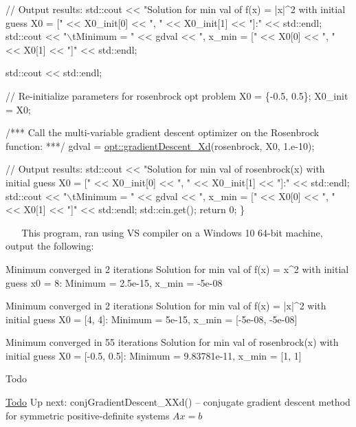 \begin{DoxyCodeInclude}
    \textcolor{comment}{// Output results:}
    std::cout << \textcolor{stringliteral}{"Solution for min val of f(x) = |x|^2 with initial guess X0 = ["} << X0\_init[0] << \textcolor{stringliteral}{", "} << 
      X0\_init[1] << \textcolor{stringliteral}{"]:"} << std::endl;
    std::cout << \textcolor{stringliteral}{"\(\backslash\)tMinimum = "} << gdval << \textcolor{stringliteral}{", x\_min = ["} << X0[0] << \textcolor{stringliteral}{", "} << X0[1] << \textcolor{stringliteral}{"]"} << std::endl;

    std::cout << std::endl;

    \textcolor{comment}{// Re-initialize parameters for rosenbrock opt problem}
    X0 = \{-0.5, 0.5\};
    X0\_init = X0;

    \textcolor{comment}{/*** Call the multi-variable gradient descent optimizer on the Rosenbrock function: ***/}
    gdval = \mbox{\hyperlink{namespaceopt_a7db27c86e1c5a503b7f8373ba067d97b}{opt::gradientDescent\_Xd}}(rosenbrock, X0, 1.e-10);

    \textcolor{comment}{// Output results:}
    std::cout << \textcolor{stringliteral}{"Solution for min val of rosenbrock(x) with initial guess X0 = ["} << X0\_init[0] << \textcolor{stringliteral}{", "} <<
       X0\_init[1] << \textcolor{stringliteral}{"]:"} << std::endl;
    std::cout << \textcolor{stringliteral}{"\(\backslash\)tMinimum = "} << gdval << \textcolor{stringliteral}{", x\_min = ["} << X0[0] << \textcolor{stringliteral}{", "} << X0[1] << \textcolor{stringliteral}{"]"} << std::endl;
    std::cin.get();
    \textcolor{keywordflow}{return} 0;
\}
\end{DoxyCodeInclude}
 ~\newline
~\newline
 This program, ran using VS compiler on a Windows 10 64-\/bit machine, output the following\+: ~\newline
 
\begin{DoxyCode}
Minimum converged in 2 iterations
Solution for min val of f(x) = x^2 with initial guess x0 = 8:
        Minimum = 2.5e-15, x\_min = -5e-08

Minimum converged in 2 iterations
Solution for min val of f(x) = |x|^2 with initial guess X0 = [4, 4]:
        Minimum = 5e-15, x\_min = [-5e-08, -5e-08]

Minimum converged in 55 iterations
Solution for min val of rosenbrock(x) with initial guess X0 = [-0.5, 0.5]:
    Minimum = 9.83781e-11, x\_min = [1, 1]
\end{DoxyCode}
 \begin{DoxyRefDesc}{Todo}
\item[\mbox{\hyperlink{todo__todo000001}{Todo}}]Up next\+: conj\+Gradient\+Descent\+\_\+\+X\+Xd() -- conjugate gradient descent method for symmetric positive-\/definite systems $Ax=b$ \end{DoxyRefDesc}


